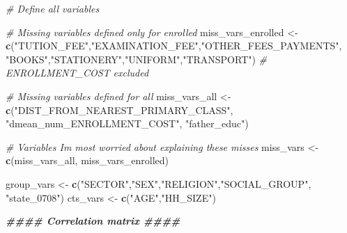 \documentclass[
]{article}
\newenvironment{Shaded}{\begin{snugshade}}{\end{snugshade}}
\newcommand{\CommentTok}[1]{\textcolor[rgb]{0.56,0.35,0.01}{\textit{#1}}}
\newcommand{\DocumentationTok}[1]{\textcolor[rgb]{0.56,0.35,0.01}{\textbf{\textit{#1}}}}
\newcommand{\FunctionTok}[1]{\textcolor[rgb]{0.13,0.29,0.53}{\textbf{#1}}}
\newcommand{\NormalTok}[1]{#1}
\newcommand{\OtherTok}[1]{\textcolor[rgb]{0.56,0.35,0.01}{#1}}
\newcommand{\StringTok}[1]{\textcolor[rgb]{0.31,0.60,0.02}{#1}}
\begin{document}
\begin{Shaded}
\begin{Highlighting}[]
\CommentTok{\# Define all variables}

\CommentTok{\# Missing variables defined only for enrolled}
\NormalTok{miss\_vars\_enrolled }\OtherTok{\textless{}{-}} \FunctionTok{c}\NormalTok{(}\StringTok{"TUTION\_FEE"}\NormalTok{,}\StringTok{"EXAMINATION\_FEE"}\NormalTok{,}\StringTok{"OTHER\_FEES\_PAYMENTS"}\NormalTok{, }\StringTok{"BOOKS"}\NormalTok{,}\StringTok{"STATIONERY"}\NormalTok{,}\StringTok{"UNIFORM"}\NormalTok{,}\StringTok{"TRANSPORT"}\NormalTok{) }\CommentTok{\# ENROLLMENT\_COST excluded}

\CommentTok{\# Missing variables defined for all}
\NormalTok{miss\_vars\_all }\OtherTok{\textless{}{-}} \FunctionTok{c}\NormalTok{(}\StringTok{"DIST\_FROM\_NEAREST\_PRIMARY\_CLASS"}\NormalTok{,}
                  \StringTok{"dmean\_num\_ENROLLMENT\_COST"}\NormalTok{,}
                  \StringTok{"father\_educ"}\NormalTok{)}

\CommentTok{\# Variables I\textquotesingle{}m most worried about explaining these misses}
\NormalTok{miss\_vars }\OtherTok{\textless{}{-}} \FunctionTok{c}\NormalTok{(miss\_vars\_all, miss\_vars\_enrolled)}

\NormalTok{group\_vars }\OtherTok{\textless{}{-}} \FunctionTok{c}\NormalTok{(}\StringTok{"SECTOR"}\NormalTok{,}\StringTok{"SEX"}\NormalTok{,}\StringTok{"RELIGION"}\NormalTok{,}\StringTok{"SOCIAL\_GROUP"}\NormalTok{, }\StringTok{"state\_0708"}\NormalTok{)}
\NormalTok{cts\_vars }\OtherTok{\textless{}{-}} \FunctionTok{c}\NormalTok{(}\StringTok{"AGE"}\NormalTok{,}\StringTok{"HH\_SIZE"}\NormalTok{)}




\DocumentationTok{\#\#\#\# Correlation matrix \#\#\#\#}


\end{Highlighting}
\end{Shaded}
\end{document}

